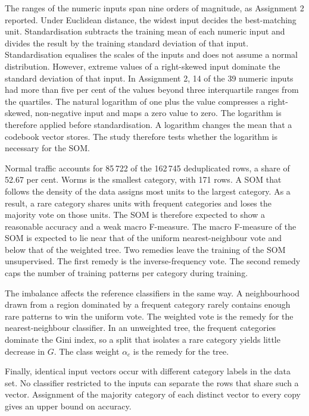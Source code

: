 \documentclass[conference,10pt]{IEEEtran}
\begin{document}
The ranges of the numeric inputs span nine orders of magnitude, as Assignment 2 reported.
Under Euclidean distance, the widest input decides the best-matching unit.
Standardisation subtracts the training mean of each numeric input and divides the result by the training standard deviation of that input.
Standardisation equalises the scales of the inputs and does not assume a normal distribution.
However, extreme values of a right-skewed input dominate the standard deviation of that input.
In Assignment 2, 14 of the 39 numeric inputs had more than five per cent of the values beyond three interquartile ranges from the quartiles.
The natural logarithm of one plus the value compresses a right-skewed, non-negative input and maps a zero value to zero.
The logarithm is therefore applied before standardisation.
A logarithm changes the mean that a codebook vector stores.
The study therefore tests whether the logarithm is necessary for the SOM.

Normal traffic accounts for 85\,722 of the 162\,745 deduplicated rows, a share of 52.67 per cent.
Worms is the smallest category, with 171 rows.
A SOM that follows the density of the data assigns most units to the largest category.
As a result, a rare category shares units with frequent categories and loses the majority vote on those units.
The SOM is therefore expected to show a reasonable accuracy and a weak macro F-measure.
The macro F-measure of the SOM is expected to lie near that of the uniform nearest-neighbour vote and below that of the weighted tree.
Two remedies leave the training of the SOM unsupervised.
The first remedy is the inverse-frequency vote.
The second remedy caps the number of training patterns per category during training.

The imbalance affects the reference classifiers in the same way.
A neighbourhood drawn from a region dominated by a frequent category rarely contains enough rare patterns to win the uniform vote.
The weighted vote is the remedy for the nearest-neighbour classifier.
In an unweighted tree, the frequent categories dominate the Gini index, so a split that isolates a rare category yields little decrease in $G$.
The class weight $\alpha_c$ is the remedy for the tree.

Finally, identical input vectors occur with different category labels in the data set.
No classifier restricted to the inputs can separate the rows that share such a vector.
Assignment of the majority category of each distinct vector to every copy gives an upper bound on accuracy.
\end{document}
